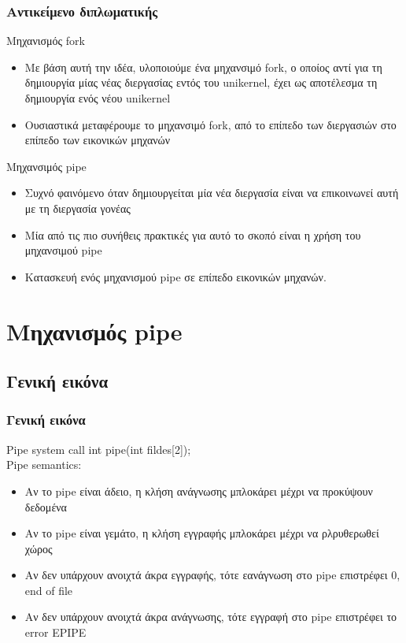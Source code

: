 \documentclass[red,slidestop,notes,compress,mathserif]{beamer}
\begin{document}
\begin{frame}
\frametitle{Αντικείμενο διπλωματικής}
\begin{block}{Μηχανισμός fork}
\begin{itemize}
\item Με βάση αυτή την ιδέα, υλοποιούμε ένα μηχανσιμό fork, ο οποίος αντί για τη δημιουργία μίας νέας διεργασίας εντός του unikernel, έχει ως αποτέλεσμα τη δημιουργία ενός νέου unikernel
\item Ουσιαστικά μεταφέρουμε το μηχανσιμό fork, από το επίπεδο των διεργασιών στο επίπεδο των εικονικών μηχανών
\end{itemize}
\end{block}
\begin{block}{Μηχανσιμός pipe}
\begin{itemize}
\item Συχνό φαινόμενο όταν δημιουργείται μία νέα διεργασία είναι να επικοινωνεί αυτή με τη διεργασία γονέας
\item Μία από τις πιο συνήθεις πρακτικές για αυτό το σκοπό είναι η χρήση του μηχανσιμού pipe
\item Κατασκευή ενός μηχανισμού pipe σε επίπεδο εικονικών μηχανών. 
\end{itemize}
\end{block}
\end{frame}

\section{Μηχανισμός pipe}
\subsection{Γενική εικόνα}

\begin{frame}
\frametitle{Γενική εικόνα}
\begin{block}{Pipe system call}
int pipe(int fildes[2]); \\
Pipe semantics:
\begin{itemize}
\item Αν το pipe είναι άδειο, η κλήση ανάγνωσης μπλοκάρει μέχρι να προκύψουν δεδομένα
\item Αν το pipe είναι γεμάτο, η κλήση εγγραφής μπλοκάρει μέχρι να ρλρυθερωθεί χώρος
\item Αν δεν υπάρχουν ανοιχτά άκρα εγγραφής, τότε εανάγνωση στο pipe επιστρέφει 0, end of file
\item Αν δεν υπάρχουν ανοιχτά άκρα ανάγνωσης, τότε εγγραφή στο pipe επιστρέφει το error EPIPE
\end{itemize}
\end{block}
\end{frame}
\end{document}
